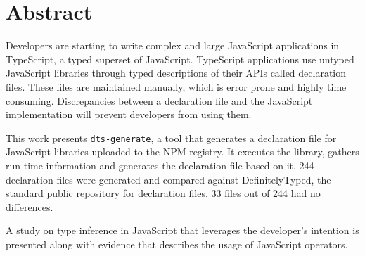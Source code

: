 \chapter*{Abstract}
Developers are starting to write complex and large JavaScript applications in TypeScript, a typed superset of JavaScript. TypeScript applications use untyped JavaScript libraries through typed descriptions of their APIs called declaration files. These files are maintained manually, which is error prone and highly time consuming. Discrepancies between a declaration file and the JavaScript implementation will prevent developers from using them.

This work presents \texttt{dts-generate}, a tool that generates a declaration file for JavaScript libraries uploaded to the NPM registry. It executes the library, gathers run-time information and generates the declaration file based on it. 244 declaration files were generated and compared against DefinitelyTyped, the standard public repository for declaration files. 33 files out of 244 had no differences.

A study on type inference in JavaScript that leverages the developer's intention is presented along with evidence that describes the usage of JavaScript operators.